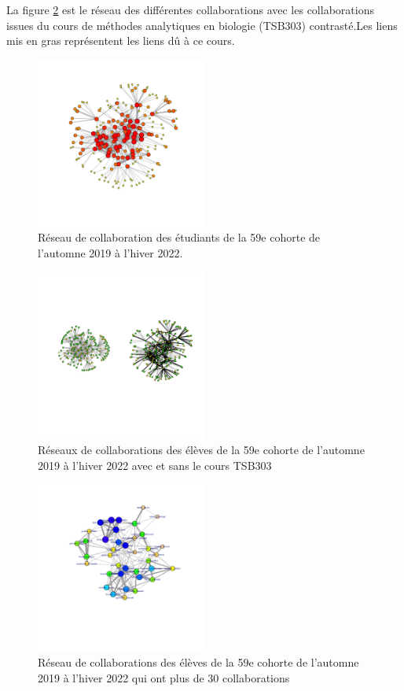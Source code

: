 \documentclass[9pt,twocolumn,twoside,]{pnas-new}
\begin{document}
La figure \ref{fig:plot2} est le réseau des différentes collaborations
avec les collaborations issues du cours de méthodes analytiques en
biologie (TSB303) contrasté.Les liens mis en gras représentent les liens
dû à ce cours.

\begin{figure}
\centering
\includegraphics[width=0.5\textwidth,height=0.4\textheight]{"../results/figure1.png"}
\caption{Réseau de collaboration des étudiants de la 59e cohorte de
l'automne 2019 à l'hiver 2022. \label{fig:plot1}}
\end{figure}

\begin{figure}
\centering
\includegraphics[width=0.5\textwidth,height=0.4\textheight]{"../results/figure2.png"}
\caption{Réseaux de collaborations des élèves de la 59e cohorte de
l'automne 2019 à l'hiver 2022 avec et sans le cours TSB303
\label{fig:plot2}}
\end{figure}

\begin{figure}
\centering
\includegraphics[width=0.5\textwidth,height=0.4\textheight]{"../results/figure3.png"}
\caption{Réseau de collaborations des élèves de la 59e cohorte de
l'automne 2019 à l'hiver 2022 qui ont plus de 30 collaborations
\label{fig:plot3}}
\end{figure}
\end{document}
